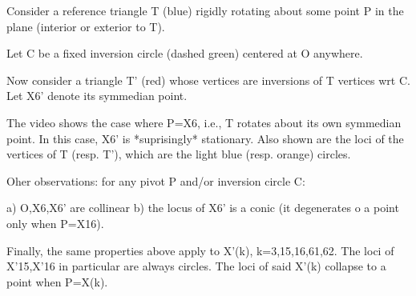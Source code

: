Consider a reference triangle T (blue) rigidly rotating about some point P in the plane (interior or exterior to T).

Let C be a fixed inversion circle (dashed green) centered at O anywhere.

Now consider a triangle T' (red) whose vertices are inversions of T vertices wrt C. Let X6' denote its symmedian point.

The video shows the case where P=X6, i.e., T rotates about its own symmedian point. In this case, X6' is *suprisingly* stationary. Also shown are the loci of the vertices of T (resp. T'), which are the light blue (resp. orange) circles.

Oher observations: for any pivot P and/or inversion circle C:

a) O,X6,X6' are collinear
b) the locus of X6' is a conic (it degenerates o a point only when P=X16).

Finally, the same properties above apply to X'(k), k=3,15,16,61,62. The loci of X'15,X'16 in particular are always circles. The loci of said X'(k) collapse to a point when P=X(k).
